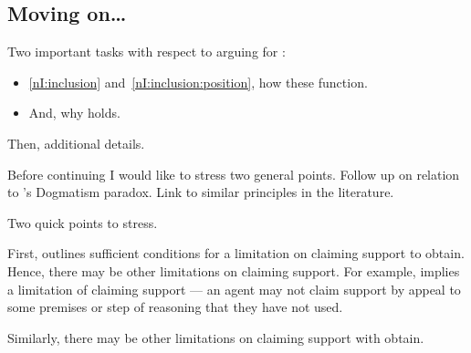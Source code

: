 \subsection{Moving on\dots}

\begin{note}[Task]
  Two important tasks with respect to arguing for \nI{}:

  \begin{itemize}
  \item \ref{nI:inclusion} and~\ref{nI:inclusion:position}, how these function.
  \item And, why \nI{} holds.
  \end{itemize}

  Then, additional details.
\end{note}

\begin{note}
  Before continuing I would like to stress two general points.
  Follow up on relation to \citeauthor{Kripke:2011wv}'s Dogmatism paradox.
  Link to similar principles in the literature.
\end{note}

\begin{note}
  Two quick points to stress.
\end{note}

\begin{note}
  First, \nI{} outlines sufficient conditions for a limitation on claiming support to obtain.
  Hence, there may be other limitations on claiming support.
  For example, \ESU{} implies a limitation of claiming support --- an agent may not claim support by appeal to some premises or step of reasoning that they have not used.

  Similarly, there may be other limitations on claiming support with obtain.
\end{note}

